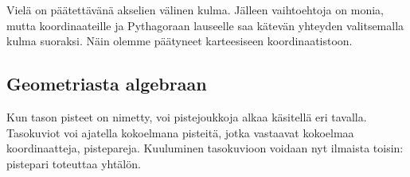 Vielä on päätettävänä akselien välinen kulma. Jälleen vaihtoehtoja on monia, mutta koordinaateille ja Pythagoraan lauseelle saa kätevän yhteyden valitsemalla kulma suoraksi. Näin olemme päätyneet karteesiseen koordinaatistoon.

\subsection{Geometriasta algebraan}

Kun tason pisteet on nimetty, voi pistejoukkoja alkaa käsitellä eri tavalla. Tasokuviot voi ajatella kokoelmana pisteitä, jotka vastaavat kokoelmaa koordinaatteja, pistepareja. Kuuluminen tasokuvioon voidaan nyt ilmaista toisin: pistepari toteuttaa yhtälön.